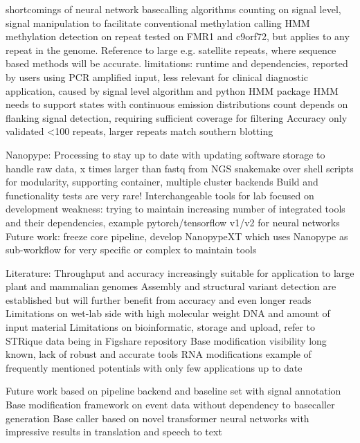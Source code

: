 shortcomings of neural network basecalling algorithms
counting on signal level, signal manipulation to facilitate conventional methylation calling
HMM methylation detection on repeat
tested on FMR1 and c9orf72, but applies to any repeat in the genome.
Reference to large e.g. satellite repeats, where sequence based methods will be accurate.
limitations: runtime and dependencies, reported by users using PCR amplified input, less relevant for clinical diagnostic application, caused by signal level algorithm and python HMM package
HMM needs to support states with continuous emission distributions 
count depends on flanking signal detection, requiring sufficient coverage for filtering
Accuracy only validated <100 repeats, larger repeats match southern blotting

Nanopype: Processing to stay up to date with updating software
storage to handle raw data, x times larger than fastq from NGS
snakemake over shell scripts for modularity, supporting container, multiple cluster backends
Build and functionality tests are very rare!
Interchangeable tools for lab focused on development
weakness: trying to maintain increasing number of integrated tools and their dependencies, example pytorch/tensorflow v1/v2 for neural networks
Future work: freeze core pipeline, develop NanopypeXT which uses Nanopype as sub-workflow for very specific or complex to maintain tools

Literature: Throughput and accuracy increasingly suitable for application to large plant and mammalian genomes
Assembly and structural variant detection are established but will further benefit from accuracy and even longer reads
Limitations on wet-lab side with high molecular weight DNA and amount of input material
Limitations on bioinformatic, storage and upload, refer to STRique data being in Figshare repository
Base modification visibility long known, lack of robust and accurate tools
RNA modifications example of frequently mentioned potentials with only few applications up to date

Future work based on pipeline backend and baseline set with signal annotation
Base modification framework on event data without dependency to basecaller generation
Base caller based on novel transformer neural networks with impressive results in translation and speech to text








